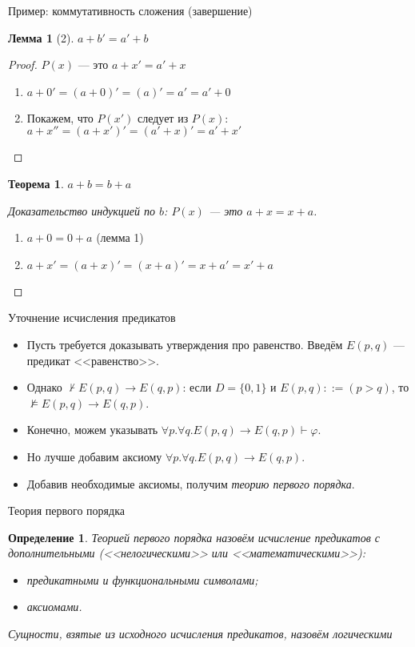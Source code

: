 \documentclass[aspectratio=169]{beamer}
\newtheorem{thm}{Теорема}[section]
\newtheorem{lmm}{Лемма}[section]
\newtheorem{dfn}{Определение}[section]
\begin{document}
\begin{frame}{Пример: коммутативность сложения (завершение)}
\begin{lmm}[2]
$a + b' = a' + b$
\end{lmm}\pause
\begin{proof} $P(x)$ --- это $a + x' = a' + x$\pause
\begin{enumerate}
\item $a + 0' = (a + 0)' = (a)' = a' = a' + 0$\pause
\item Покажем, что $P(x')$ следует из $P(x)$: $a + x'' = (a + x')' = (a' + x)' = a' + x'$
\end{enumerate}
\end{proof}\pause

\begin{thm}
$a + b = b + a$
\end{thm}\pause
\begin{proof}[Доказательство индукцией по $b$: $P(x)$ --- это $a + x = x + a$]
\begin{enumerate}
\item $a + 0 = 0 + a$ (лемма 1)\pause
\item $a + x' = (a + x)' = (x + a)' = x + a' = x' + a$
\end{enumerate}
\end{proof}
\end{frame}

\begin{frame}{Уточнение исчисления предикатов}
\begin{itemize}
\item Пусть требуется доказывать утверждения про равенство. Введём $E(p,q)$ --- предикат <<равенство>>.\pause
\item Однако $\not\vdash E(p,q)\to E(q,p)$: если $D = \{0,1\}$ и $E(p,q) ::= (p>q)$,
то $\not\models E(p,q)\to E(q,p)$.\pause
\item Конечно, можем указывать $\forall p.\forall q.E(p,q)\to E(q,p) \vdash \varphi$.\pause
\item Но лучше добавим аксиому $\forall p.\forall q.E(p,q)\to E(q,p)$.\pause
\item Добавив необходимые аксиомы, получим \emph{теорию первого порядка}.
\end{itemize}
\end{frame}

\begin{frame}{Теория первого порядка}
\begin{dfn}
Теорией первого порядка назовём исчисление предикатов с дополнительными (<<нелогическими>>
или <<математическими>>):
\begin{itemize}
\item предикатными и функциональными символами;
\item аксиомами.
\end{itemize}

Сущности, взятые из исходного исчисления предикатов, назовём \emph{логическими}
\end{dfn}
\end{frame}
\end{document}
